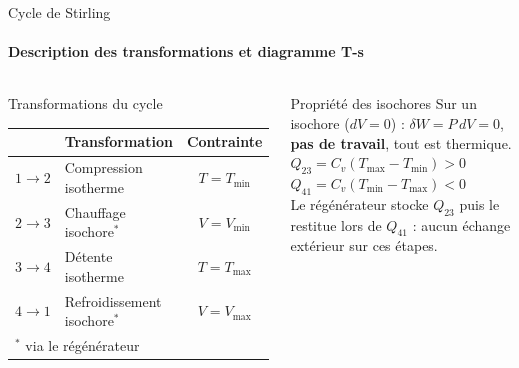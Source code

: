 \documentclass[aspectratio=43, 10pt]{beamer}
\newcommand{\Tmin}{T_{\min}}
\newcommand{\Tmax}{T_{\max}}
\begin{document}
\begin{frame}{Cycle de Stirling }
  \framesubtitle{Description des transformations et diagramme T-s}

  \begin{columns}[T,onlytextwidth]
      \begin{block}{Transformations du cycle}
        \scriptsize
        \renewcommand{\arraystretch}{1.0}
        \begin{tabular}{clc}
          \toprule
          & Transformation & Contrainte \\
          \midrule
          $1\!\to\!2$ & Compression isotherme    & $T = \Tmin$ \\
          $2\!\to\!3$ & Chauffage isochore$^*$   & $V = V_{\min}$ \\
          $3\!\to\!4$ & D\'etente isotherme      & $T = \Tmax$ \\
          $4\!\to\!1$ & Refroidissement isochore$^*$ & $V = V_{\max}$ \\
          \bottomrule
          \multicolumn{3}{l}{\tiny $^*$ via le r\'eg\'en\'erateur}
        \end{tabular}
      \end{block}

      \begin{exampleblock}{Propri\'et\'e des isochores}
        \small
        Sur un isochore ($dV = 0$) : $\delta W = P\,dV = 0$,
        \textbf{pas de travail}, tout est thermique.\\
        $Q_{23} = C_v(\Tmax - \Tmin) > 0$\\
        $Q_{41} = C_v(\Tmin - \Tmax) < 0$\\
        Le r\'eg\'en\'erateur stocke $Q_{23}$ puis le
        restitue lors de $Q_{41}$ :
        aucun \'echange ext\'erieur sur ces \'etapes.
      \end{exampleblock}


\end{columns}
\end{frame}
\end{document}
